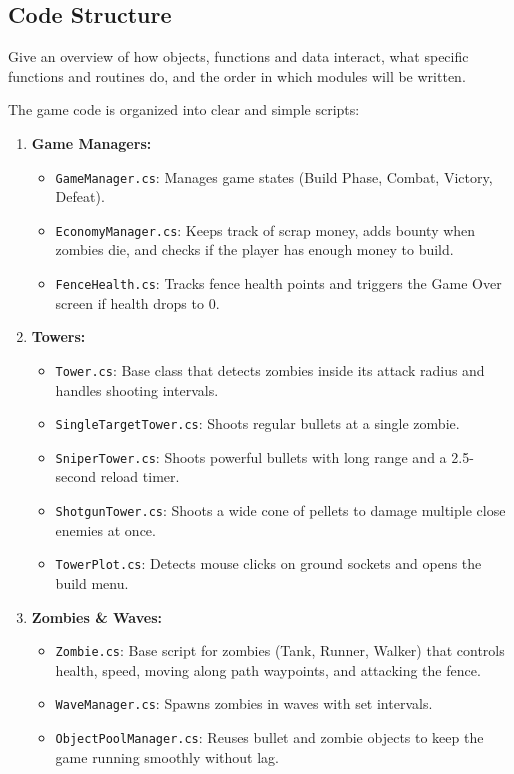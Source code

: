 \subsection{Code Structure}

\begin{guidance}
Give an overview of how objects, functions and data interact, what specific functions and routines do, and the order in which modules will be written.
\end{guidance}
The game code is organized into clear and simple scripts:
\begin{enumerate}
  \item \textbf{Game Managers:}
    \begin{itemize}[label=$\circ$]
      \item \texttt{GameManager.cs}: Manages game states (Build Phase, Combat, Victory, Defeat).
      \item \texttt{EconomyManager.cs}: Keeps track of scrap money, adds bounty when zombies die, and checks if the player has enough money to build.
      \item \texttt{FenceHealth.cs}: Tracks fence health points and triggers the Game Over screen if health drops to 0.
    \end{itemize}
  \item \textbf{Towers:}
    \begin{itemize}[label=$\circ$]
      \item \texttt{Tower.cs}: Base class that detects zombies inside its attack radius and handles shooting intervals.
      \item \texttt{SingleTargetTower.cs}: Shoots regular bullets at a single zombie.
      \item \texttt{SniperTower.cs}: Shoots powerful bullets with long range and a 2.5-second reload timer.
      \item \texttt{ShotgunTower.cs}: Shoots a wide cone of pellets to damage multiple close enemies at once.
      \item \texttt{TowerPlot.cs}: Detects mouse clicks on ground sockets and opens the build menu.
    \end{itemize}
  \item \textbf{Zombies \& Waves:}
    \begin{itemize}[label=$\circ$]
      \item \texttt{Zombie.cs}: Base script for zombies (Tank, Runner, Walker) that controls health, speed, moving along path waypoints, and attacking the fence.
      \item \texttt{WaveManager.cs}: Spawns zombies in waves with set intervals.
      \item \texttt{ObjectPoolManager.cs}: Reuses bullet and zombie objects to keep the game running smoothly without lag.
    \end{itemize}
\end{enumerate}

